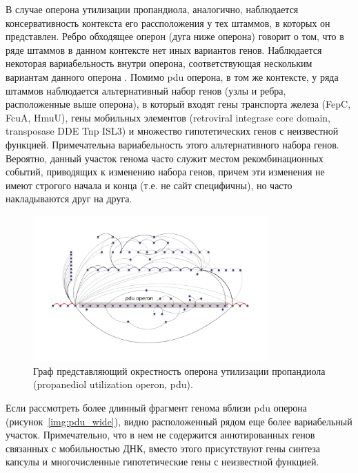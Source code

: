 В случае оперона утилизации пропандиола, аналогично, наблюдается консервативность контекста его рассположения у тех штаммов, в которых он представлен. Ребро обходящее оперон (дуга ниже оперона) говорит о том, что в ряде штаммов в данном контексте нет иных вариантов генов. Наблюдается некоторая вариабельность внутри оперона, соответствующая нескольким вариантам данного оперона \cite{rakitina2017genome}. Помимо pdu оперона, в том же контексте, у ряда штаммов наблюдается альтернативный набор генов (узлы и ребра, расположенные выше оперона), в который входят гены транспорта железа (FepC, FcuA, HmuU), гены мобильных элементов (retroviral integrase core domain, transposase DDE Tnp ISL3) и множество гипотетических генов с неизвестной функцией. Примечательна вариабельность этого альтернативного набора генов. Вероятно, данный участок генома часто служит местом рекомбинационных событий, приводящих к изменению набора генов, причем эти изменения не имеют строгого начала и конца (т.е. не сайт специфичны), но часто накладываются друг на друга. 

\begin{figure}[!ht] 
  \center
    \includegraphics[width=0.8\textwidth]{Dissertation/images/subgraphs/pdutail1minw2_v2.pdf}
  \caption{Граф представляющий окрестность оперона утилизации пропандиола (propanediol utilization operon, pdu). }
  \label{img:sub_pdu} 
\end{figure}

Если рассмотреть более длинный фрагмент генома вблизи pdu оперона  (рисунок~\ref{img:pdu_wide}), видно расположенный рядом еще более вариабельный участок. Примечательно, что в нем не содержится аннотированных генов связанных с мобильностью ДНК, вместо этого присутствуют гены синтеза капсулы и многочисленные гипотетические гены с неизвестной функцией. 

